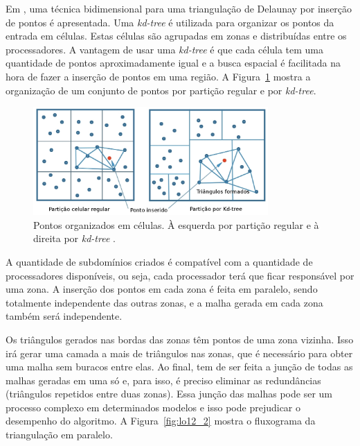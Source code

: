Em \cite{bib:Lo12}, uma técnica bidimensional para uma triangulação de Delaunay por inserção de pontos é apresentada. Uma \textit{kd-tree} é utilizada para organizar os pontos da entrada em células. Estas células são agrupadas em zonas e distribuídas entre os processadores. A vantagem de usar uma \textit{kd-tree} é que cada célula tem uma quantidade de pontos aproximadamente igual e a busca espacial é facilitada na hora de fazer a inserção de pontos em uma região. A Figura~\ref{fig:lo12_1} mostra a organização de um conjunto de pontos por partição regular e por \textit{kd-tree}.
 
 
 \begin{figure}[htbp]
     \centering
     \includegraphics[width=0.8\textwidth]{fig/lo12_1.jpg}
     \caption{Pontos organizados em células. À esquerda por partição regular e à direita por \textit{kd-tree} \cite{bib:Lo12}.}
     \label{fig:lo12_1}
 \end{figure} 

 
A quantidade de subdomínios criados é compatível com a quantidade de processadores disponíveis, ou seja, cada processador terá que ficar responsável por uma zona. A inserção dos pontos em cada zona é feita em paralelo, sendo totalmente independente das outras zonas, e a malha gerada em cada zona também será independente.
 
Os triângulos gerados nas bordas das zonas têm pontos de uma zona vizinha. Isso irá gerar uma camada a mais de triângulos nas zonas, que é necessário para obter uma malha sem buracos entre elas. Ao final, tem de ser feita a junção de todas as malhas geradas em uma só e, para isso, é preciso eliminar as redundâncias (triângulos repetidos entre duas zonas). Essa junção das malhas pode ser um processo complexo em determinados modelos e isso pode prejudicar o desempenho do algoritmo. A Figura~\ref{fig:lo12_2} mostra o fluxograma da triangulação em paralelo.
 
